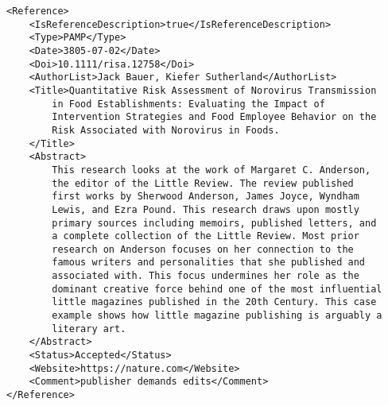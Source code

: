 \documentclass[a4paper]{report}
\begin{document}
\begin{lstlisting}[basicstyle=\footnotesize, caption={Example of Reference}]
<Reference>
    <IsReferenceDescription>true</IsReferenceDescription>
    <Type>PAMP</Type>
    <Date>3805-07-02</Date>
    <Doi>10.1111/risa.12758</Doi>
    <AuthorList>Jack Bauer, Kiefer Sutherland</AuthorList>
    <Title>Quantitative Risk Assessment of Norovirus Transmission
        in Food Establishments: Evaluating the Impact of
        Intervention Strategies and Food Employee Behavior on the
        Risk Associated with Norovirus in Foods.
    </Title>
    <Abstract>
        This research looks at the work of Margaret C. Anderson,
        the editor of the Little Review. The review published
        first works by Sherwood Anderson, James Joyce, Wyndham
        Lewis, and Ezra Pound. This research draws upon mostly
        primary sources including memoirs, published letters, and
        a complete collection of the Little Review. Most prior
        research on Anderson focuses on her connection to the
        famous writers and personalities that she published and
        associated with. This focus undermines her role as the
        dominant creative force behind one of the most influential
        little magazines published in the 20th Century. This case
        example shows how little magazine publishing is arguably a
        literary art.
    </Abstract>
    <Status>Accepted</Status>
    <Website>https://nature.com</Website>
    <Comment>publisher demands edits</Comment>
</Reference>
\end{lstlisting}    

\end{document}
